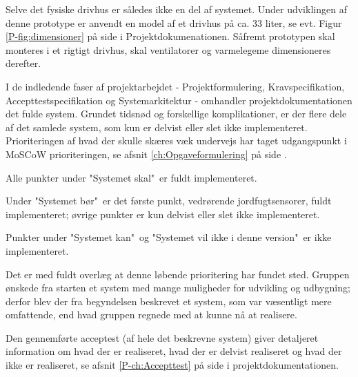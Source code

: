 Selve det fysiske drivhus er således ikke en del af systemet. 
Under udviklingen af denne prototype er anvendt en model af et drivhus på ca. 33 liter, se evt. Figur \ref{P-fig:dimensioner} på side \pageref{P-fig:dimensioner} i Projektdokumenationen. 
Såfremt prototypen skal monteres i et rigtigt drivhus, skal ventilatorer og varmelegeme dimensioneres derefter.

\mbox{}

I de indledende faser af projektarbejdet - Projektformulering, Kravspecifikation, Accepttestspecifikation og Systemarkitektur - omhandler projektdokumentationen det fulde system.
Grundet tidsnød og forskellige komplikationer, er der flere dele af det samlede system, som kun er delvist eller slet ikke implementeret.
Prioriteringen af hvad der skulle skæres væk undervejs har taget udgangspunkt i MoSCoW prioriteringen, se afsnit \ref{ch:Opgaveformulering}  på side \pageref{ch:Opgaveformulering}.

Alle punkter under "Systemet skal"\ er fuldt implementeret. 

Under "Systemet bør"\ er det første punkt, vedrørende jordfugtsensorer, fuldt implementeret; øvrige punkter er kun delvist eller slet ikke implementeret.

Punkter under "Systemet kan"\ og "Systemet vil ikke i denne version"\ er ikke implementeret. 

Det er med fuldt overlæg at denne løbende prioritering har fundet sted. 
Gruppen ønskede fra starten et system med mange muligheder for udvikling og udbygning; derfor blev der fra begyndelsen beskrevet et system, som var væsentligt mere omfattende, end hvad gruppen regnede med at kunne nå at realisere.

\mbox{}

Den gennemførte acceptest (af hele det beskrevne system) giver detaljeret information om hvad der er realiseret, hvad der er delvist realiseret og hvad der ikke er realiseret, se afsnit \ref{P-ch:Accepttest}  på side \pageref{P-ch:Accepttest} i projektdokumentationen. 


\clearpage